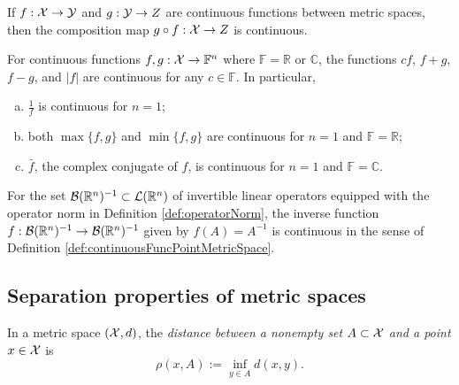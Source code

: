 \begin{lem}
  \label{lem:compositionMapIsContinuous}
  If $f:{\cal X}\rightarrow {\cal Y}$ and $g:{\cal Y}\rightarrow Z$
  are continuous functions between metric spaces,
  then the composition map $g\circ f: {\cal X}\rightarrow Z$
  is continuous.
\end{lem}

\begin{lem}
  \label{lem:elementaryMapIsContinuousNF}
  For continuous functions $f,g:{\cal X}\rightarrow\mathbb{F}^n$ 
  where $\mathbb{F}=\mathbb{R}$ or $\mathbb{C}$, 
  the functions $cf$, $f+g$, $f-g$, and $|f|$
  are continuous for any $c\in\mathbb{F}$.
  In particular, 
  \begin{enumerate}[(a)]\itemsep0em
  \item $\frac{1}{f}$ is continuous for $n=1$;
  \item both $\max\{f,g\}$ and $\min\{f,g\}$
    are continuous for $n=1$ and $\mathbb{F}=\mathbb{R}$;
  \item $\bar{f}$, the complex conjugate of $f$, is continuous
    for $n=1$ and $\mathbb{F}=\mathbb{C}$. 
  \end{enumerate}
\end{lem}

\begin{lem}
  \label{lem:funcInverseIsContinuous}
  For the set ${\cal B}(\mathbb{R}^n)^{-1}\subset
  {\cal L}(\mathbb{R}^n)$
  of invertible linear operators equipped
  with the operator norm in Definition \ref{def:operatorNorm},
  the inverse function 
  $f: {\cal B}(\mathbb{R}^n)^{-1}\rightarrow
  {\cal B}(\mathbb{R}^n)^{-1}$ 
  given by $f(A) = A^{-1}$ is continuous
  in the sense of Definition \ref{def:continuousFuncPointMetricSpace}.
\end{lem}

\subsection{Separation properties of metric spaces}
\label{sec:separ-prop}

\begin{defn}
  \label{def:distPointAndSet}
  In a metric space $({\cal X},d)$, 
  the \emph{distance between a nonempty set $A\subset {\cal X}$
    and a point $x\in {\cal X}$}
  is
  \begin{equation}
    \label{eq:distPointAndSet}
    \rho(x,A) := \inf_{y\in A} d(x,y).
  \end{equation}
\end{defn}

